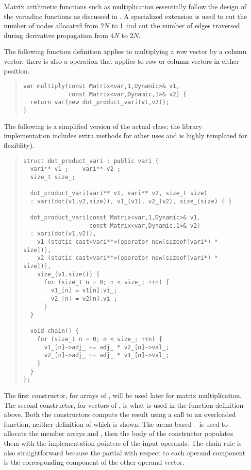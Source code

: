 \documentclass[10pt]{article}
\begin{document}
Matrix arithmetic functions such as multiplication essentially follow
the design of the variadiac functions as discussed in
.   A specialized  extension
is used to cut the number of nodes allocated from $2N$ to 1 and cut the
number of edges traversed during derivative propagation from $4N$ to $2N$.  

The following function definition applies to multiplying a row vector
by a column vector;  there is also a  operation
that applies to row or column vectors in either position.
%
\begin{quote}
\begin{Verbatim}
var multiply(const Matrix<var,1,Dynamic>& v1,
             const Matrix<var,Dynamic,1>& v2) {
  return var(new dot_product_vari(v1,v2));
}
\end{Verbatim}
\end{quote}
%
The following is a simplified version of the actual
 class; the library implementation includes
extra methods for other uses and is highly templated for flexiblity).
%
\begin{quote}
\begin{Verbatim}
struct dot_product_vari : public vari {
  vari** v1_;    vari** v2_;
  size_t size_;
  
  dot_product_vari(vari** v1, vari** v2, size_t size) 
  : vari(dot(v1,v2,size)), v1_(v1), v2_(v2), size_(size) { }

  dot_product_vari(const Matrix<var,1,Dynamic>& v1,
                   const Matrix<var,Dynamic,1>& v2)
  : vari(dot(v1,v2)),
    v1_(static_cast<vari**>(operator new(sizeof(vari*) * size))),
    v2_(static_cast<vari**>(operator new(sizeof(vari*) * size))),
    size_(v1.size()) {
      for (size_t n = 0; n < size_; ++n) {
        v1_[n] = v1[n].vi_;  
        v2_[n] = v2[n].vi_;
      }
  }

  void chain() {
    for (size_t n = 0; n < size_; ++n) {
      v1_[n]->adj_ += adj_ * v2_[n]->val_;
      v2_[n]->adj_ += adj_ * v1_[n]->val_;
    }
  }
};
\end{Verbatim}
\end{quote}
%
The first constructor, for arrays of , will be used later
for matrix multiplication.  The second constructor, for vectors of
, is what is used in the function definition above.  Both
the constructors compute the result using a call to an overloaded
function, neither definition of which is shown.  The arena-based
~ is used to allocate the member arrays
 and , then the body of the constructor
populates them with the implementation pointers of the input operands.
The chain rule is also straightforward because the partial with
respect to each operand component is the corresponding component of
the other operand vector.
\end{document}
